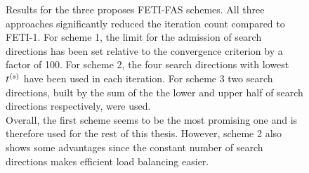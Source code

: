 \begin{figure}[h!]
  \begin{center}
    
    \caption[Results for the proposed FETI-FAS schemes]{Results for the three proposes FETI-FAS schemes. All three approaches significantly reduced the iteration count compared to FETI-1. For scheme 1, the limit for the admission of search directions has been set relative to the convergence criterion by a factor of 100. For scheme 2, the four search directions with lowest ${t}^{(s)}$ have been used in each iteration. For scheme 3 two search directions, built by the sum of the the lower and upper half of search directions respectively, were used.\\
    Overall, the first scheme seems to be the most promising one and is therefore used for the rest of this thesis. However, scheme 2 also shows some advantages since the constant number of search directions makes efficient load balancing easier.}
    \label{fig:fetifas_schemes}
  \end{center}
\end{figure}






